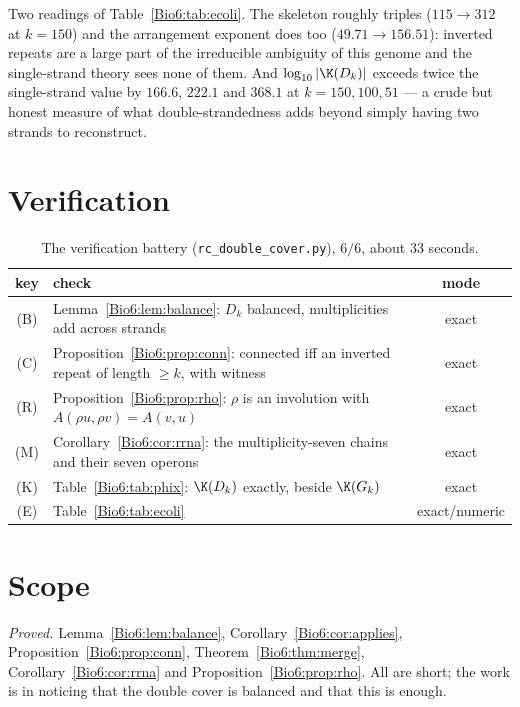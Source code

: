 Two readings of Table~\ref{Bio6:tab:ecoli}. The skeleton roughly triples ($115\to312$ at
$k=150$) and the arrangement exponent does too ($49.71\to156.51$): inverted repeats are a
large part of the irreducible ambiguity of this genome and the single-strand theory sees
none of them. And $\log_{10}|\K(D_k)|$ exceeds twice the single-strand value by $166.6$,
$222.1$ and $368.1$ at $k=150,100,51$ --- a crude but honest measure of what
double-strandedness adds beyond simply having two strands to reconstruct.

\section{Verification}\label{Bio6:sec:battery}

\begin{table}[ht]
\centering\small
\begin{tabular}{clc}
\toprule
key & check & mode\\
\midrule
(B) & Lemma~\ref{Bio6:lem:balance}: $D_k$ balanced, multiplicities add across strands & exact\\
(C) & Proposition~\ref{Bio6:prop:conn}: connected iff an inverted repeat of length $\ge k$, with witness & exact\\
(R) & Proposition~\ref{Bio6:prop:rho}: $\rho$ is an involution with $A(\rho u,\rho v)=A(v,u)$ & exact\\
(M) & Corollary~\ref{Bio6:cor:rrna}: the multiplicity-seven chains and their seven operons & exact\\
(K) & Table~\ref{Bio6:tab:phix}: $\K(D_k)$ exactly, beside $\K(G_k)$ & exact\\
(E) & Table~\ref{Bio6:tab:ecoli} & exact/numeric\\
\bottomrule
\end{tabular}
\caption{The verification battery (\texttt{rc\_double\_cover.py}), $6/6$, about $33$
seconds.}
\label{Bio6:tab:battery}
\end{table}

\section{Scope}\label{Bio6:sec:scope}

\emph{Proved.} Lemma~\ref{Bio6:lem:balance}, Corollary~\ref{Bio6:cor:applies},
Proposition~\ref{Bio6:prop:conn}, Theorem~\ref{Bio6:thm:merge}, Corollary~\ref{Bio6:cor:rrna} and
Proposition~\ref{Bio6:prop:rho}. All are short; the work is in noticing that the double cover
is balanced and that this is enough.

